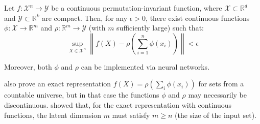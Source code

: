 \begin{theorem}\label{thm:deepsets_universal}
Let $f: \mathcal{X}^n \to \mathcal{Y}$ be a continuous permutation-invariant function, where $\mathcal{X} \subset \mathbb{R}^d$ and $\mathcal{Y} \subset \mathbb{R}^k$ are compact. Then, for any $\epsilon > 0$, there exist continuous functions $\phi: \mathcal{X} \to \mathbb{R}^m$ and $\rho: \mathbb{R}^m \to \mathcal{Y}$ (with $m$ sufficiently large) such that:
\begin{equation}
\sup_{X \in \mathcal{X}^n} \left\|f(X) - \rho\left(\sum_{i=1}^n \phi(x_i)\right)\right\| < \epsilon
\label{eq:deepsets_representation}
\end{equation}

Moreover, both $\phi$ and $\rho$ can be implemented via neural networks.
\end{theorem}

\begin{remark}
\citet{zaheer2017deepsets} also prove an exact representation $f(X) = \rho(\sum_i \phi(x_i))$ for sets from a countable universe, but in that case the functions $\phi$ and $\rho$ may necessarily be discontinuous. \citet{wagstaff2019limitations} showed that, for the exact representation with continuous functions, the latent dimension $m$ must satisfy $m \geq n$ (the size of the input set).
\end{remark}

